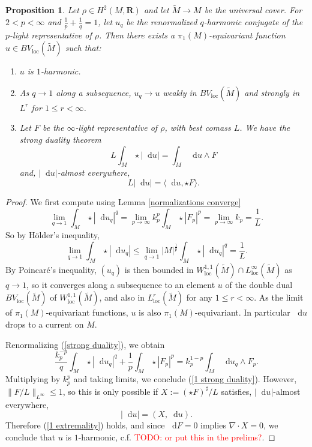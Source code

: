 \documentclass[reqno,11pt]{amsart}
\newcommand{\RR}{\mathbf{R}}
\newcommand*\dif{\mathop{}\!\mathrm{d}}
\newcommand{\loc}{\mathrm{loc}}
\newtheorem{proposition}[theorem]{Proposition}
\theoremstyle{definition}
\numberwithin{equation}{section}
\newcommand\todo[1]{\textcolor{red}{TODO: #1}}
\begin{document}
\begin{proposition}
Let $\rho \in H^2(M, \RR)$ and let $\tilde M \to M$ be the universal cover.
For $2 < p < \infty$ and $\frac{1}{p} + \frac{1}{q} = 1$, let $u_q$ be the renormalized $q$-harmonic conjugate of the $p$-light representative of $\rho$.
Then there exists a $\pi_1(M)$-equivariant function $u \in BV_\loc(\tilde M)$ such that:
\begin{enumerate}
\item $u$ is $1$-harmonic.
\item As $q \to 1$ along a subsequence, $u_q \to u$ weakly in $BV_\loc(\tilde M)$ and strongly in $L^r$ for $1 \leq r < \infty$.
\item Let $F$ be the $\infty$-light representative of $\rho$, with best comass $L$. We have the strong duality theorem 
\begin{equation}\label{1 strong duality}
	L \int_M \star |\dif u| = \int_M \dif u \wedge F
\end{equation}
and, $|\dif u|$-almost everywhere,
\begin{equation}\label{1 extremality}
L |\dif u| = \langle \dif u, \star F\rangle.
\end{equation}
\end{enumerate}
\end{proposition}
\begin{proof}
We first compute using Lemma \ref{normalizations converge}
\begin{equation}\label{Lqs of qLaplace converge}
\lim_{q \to 1} \int_M \star |\dif u_q|^q = \lim_{p \to \infty} k_p^p \int_M \star |F_p|^p = \lim_{p \to \infty} k_p = \frac{1}{L}.
\end{equation}
So by H\"older's inequality,
$$\lim_{q \to 1} \int_M \star |\dif u_q| \leq \lim_{q \to 1} |M|^{\frac{1}{p}} \int_M \star |\dif u_q|^q = \frac{1}{L}.$$
By Poincar\'e's inequality, $(u_q)$ is then bounded in $W^{1, 1}_\loc(\tilde M) \cap L^\infty_\loc(\tilde M)$ as $q \to 1$, so it converges along a subsequence to an element $u$ of the double dual $BV_\loc(\tilde M)$ of $W^{1, 1}_\loc(\tilde M)$, and also in $L^r_\loc(\tilde M)$ for any $1 \leq r < \infty$.
As the limit of $\pi_1(M)$-equivariant functions, $u$ is also $\pi_1(M)$-equivariant.
In particular $\dif u$ drops to a current on $M$.

Renormalizing (\ref{strong duality}), we obtain 
$$\frac{k_p^{-p}}{q} \int_M \star |\dif u_q|^q + \frac{1}{p} \int_M \star |F_p|^p = k_p^{1 - p} \int_M \dif u_q \wedge F_p.$$
Multiplying by $k_p^p$ and taking limits, we conclude (\ref{1 strong duality}).
However, $\|F/L\|_{L^\infty} \leq 1$, so this is only possible if $X := (\star F)^\sharp/L$ satisfies, $|\dif u|$-almost everywhere,
$$|\dif u| = (X, \dif u).$$
Therefore (\ref{1 extremality}) holds, and since $\dif F = 0$ implies $\nabla \cdot X = 0$, we conclude that $u$ is $1$-harmonic, c.f. \cite{Mazon14} \todo{or put this in the prelims?}.
\end{proof}
\end{document}
